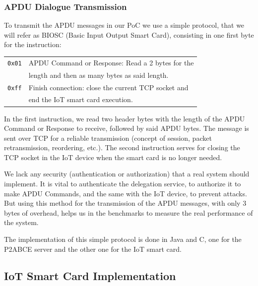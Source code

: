 \subsubsection{APDU Dialogue Transmission}


To transmit the APDU messages in our PoC we use a simple protocol, that we will refer as BIOSC (Basic Input Output Smart Card), consisting in one first byte for the instruction: 

\hfil

\begin{tabular}{|c|l|}
	\hline
	\texttt{0x01} & APDU Command or Response: Read a 2 bytes for the\\& length and then as many bytes as said length. \\
	\hline
	\texttt{0xff} & Finish connection: close the current TCP socket and\\& end the IoT smart card execution. \\
	\hline
\end{tabular}

\hfil

In the first instruction, we read two header bytes with the length of the APDU Command or Response to receive, followed by said APDU bytes. The message is sent over TCP for a reliable transmission (concept of session, packet retransmission, reordering, etc.). The second instruction serves for closing the TCP socket in the IoT device when the smart card is no longer needed.

We lack any security (authentication or authorization) that a real system should implement. It is vital to authenticate the delegation service, to authorize it to make APDU Commands, and the same with the IoT device, to prevent attacks. But using this method for the transmission of the APDU messages, with only 3 bytes of overhead, helps us in the  benchmarks to measure the real performance of the system.


\hfil


The implementation of this simple protocol is done in Java and C, one for the P2ABCE server and the other one for the IoT smart card.






\subsection{IoT Smart Card Implementation}



